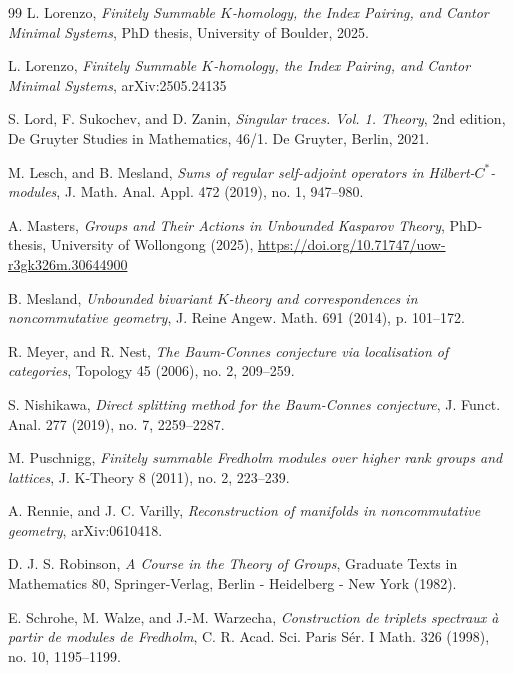 \documentclass[a4paper,reqno]{amsart}
\numberwithin{equation}{section}
\theoremstyle{definition}
\theoremstyle{remark}
\begin{document}
\begin{thebibliography}{99}
 L. Lorenzo, \emph{Finitely Summable $K$-homology, the Index Pairing, and Cantor Minimal Systems}, PhD thesis, University of Boulder, 2025.


 L. Lorenzo, \emph{Finitely Summable  $K$-homology, the Index Pairing, and Cantor Minimal Systems}, arXiv:2505.24135


 S. Lord, F. Sukochev, and D. Zanin, \emph{Singular traces. Vol. 1. Theory}, 2nd edition, De Gruyter Studies in Mathematics, 46/1. De Gruyter, Berlin, 2021.



 M. Lesch, and B. Mesland, \emph{Sums of regular self-adjoint operators in Hilbert-$C^*$-modules}, J. Math. Anal. Appl. 472 (2019), no. 1, 947--980. 


 A. Masters, \emph{Groups and Their Actions in Unbounded Kasparov Theory}, PhD-thesis, University of Wollongong (2025), \href{https://doi.org/10.71747/uow-r3gk326m.30644900}{https://doi.org/10.71747/uow-r3gk326m.30644900}


  B. Mesland, \emph{Unbounded bivariant $K$-theory and correspondences in noncommutative geometry}, J. Reine Angew. Math. 691 (2014), p. 101--172.


 R. Meyer, and R. Nest, \emph{The Baum-Connes conjecture via localisation of categories}, Topology 45 (2006), no. 2, 209--259.




 S. Nishikawa, \emph{Direct splitting method for the Baum-Connes conjecture}, J. Funct. Anal. 277 (2019), no. 7, 2259--2287. 






 M. Puschnigg, \emph{Finitely summable Fredholm modules over higher rank groups and lattices}, J. K-Theory 8 (2011), no. 2, 223--239. 




 A. Rennie, and J. C. Varilly, \emph{Reconstruction of manifolds in noncommutative geometry}, arXiv:0610418.

 D. J. S. Robinson, \emph{A Course in the Theory of Groups}, Graduate Texts in Mathematics 80, Springer-Verlag, Berlin - Heidelberg - New York (1982).



 E. Schrohe, M. Walze, and J.-M. Warzecha, \emph{Construction de triplets spectraux à partir de modules de Fredholm}, C. R. Acad. Sci. Paris Sér. I Math. 326 (1998), no. 10, 1195--1199.



\end{thebibliography}
\end{document}
